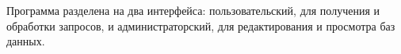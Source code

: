 Программа разделена на два интерфейса: пользовательский, для получения и обработки запросов, и администраторский, для редактирования и просмотра баз данных.